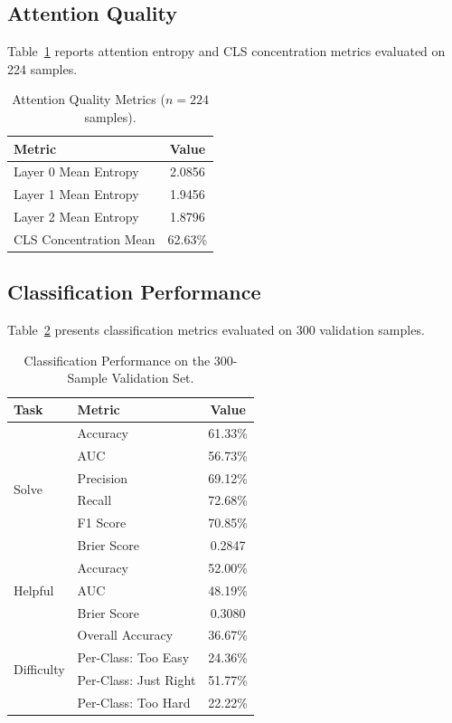 \documentclass[12pt]{article}
\begin{document}
\subsection{Attention Quality}

Table~\ref{tab:attention} reports attention entropy and CLS concentration metrics evaluated on 224 samples.

\begin{table}[H]
\centering
\caption{Attention Quality Metrics ($n = 224$ samples).}
\label{tab:attention}
\begin{tabular}{lc}
\toprule
\textbf{Metric} & \textbf{Value} \\
\midrule
Layer 0 Mean Entropy & 2.0856 \\
Layer 1 Mean Entropy & 1.9456 \\
Layer 2 Mean Entropy & 1.8796 \\
CLS Concentration Mean & 62.63\% \\
\bottomrule
\end{tabular}
\end{table}

\subsection{Classification Performance}

Table~\ref{tab:classification} presents classification metrics evaluated on 300 validation samples.

\begin{table}[H]
\centering
\caption{Classification Performance on the 300-Sample Validation Set.}
\label{tab:classification}
\begin{tabular}{llc}
\toprule
\textbf{Task} & \textbf{Metric} & \textbf{Value} \\
\midrule
\multirow{6}{*}{Solve} & Accuracy & 61.33\% \\
 & AUC & 56.73\% \\
 & Precision & 69.12\% \\
 & Recall & 72.68\% \\
 & F1 Score & 70.85\% \\
 & Brier Score & 0.2847 \\
\midrule
\multirow{3}{*}{Helpful} & Accuracy & 52.00\% \\
 & AUC & 48.19\% \\
 & Brier Score & 0.3080 \\
\midrule
\multirow{4}{*}{Difficulty} & Overall Accuracy & 36.67\% \\
 & Per-Class: Too Easy & 24.36\% \\
 & Per-Class: Just Right & 51.77\% \\
 & Per-Class: Too Hard & 22.22\% \\
\bottomrule
\end{tabular}
\end{table}
\end{document}
